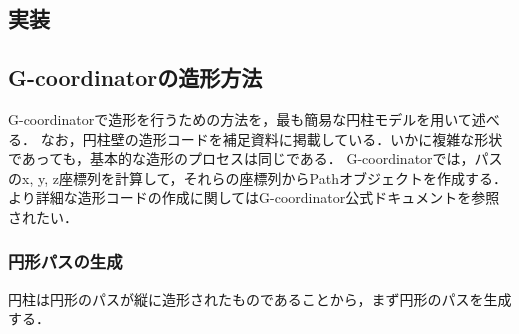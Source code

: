 \documentclass{article}
\begin{document}
\begin{twocolumn}
%

\section{実装}
\subsection{G-coordinatorの造形方法}
G-coordinatorで造形を行うための方法を，最も簡易な円柱モデルを用いて述べる．
なお，円柱壁の造形コードを補足資料に掲載している．いかに複雑な形状であっても，基本的な造形のプロセスは同じである．
G-coordinatorでは，パスのx, y, z座標列を計算して，それらの座標列からPathオブジェクトを作成する．
より詳細な造形コードの作成に関してはG-coordinator公式ドキュメントを参照されたい．
\subsubsection{円形パスの生成}
円柱は円形のパスが縦に造形されたものであることから，まず円形のパスを生成する．


\end{twocolumn}
\end{document}

